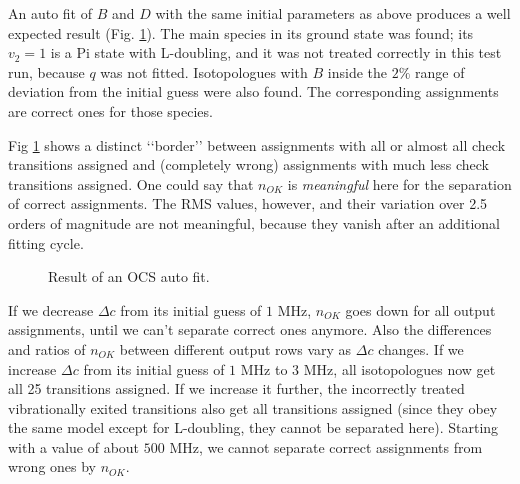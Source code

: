 \documentclass[11pt]{article}
\begin{document}
An auto fit of $B$ and $D$ with the same initial parameters as above produces a well expected result (Fig. \ref{fig:ocs_first_try}). The main species in its ground state was found; its $v_2 = 1$ is a Pi state with L-doubling, and it was not treated correctly in this test run, because $q$ was not fitted. Isotopologues with $B$ inside the $2\%$ range of deviation from the initial guess were also found. The corresponding assignments are correct ones for those species.

Fig \ref{fig:ocs_first_try} shows a distinct \lq\lq{}border\rq\rq{} between assignments with all or almost all check transitions assigned and (completely wrong) assignments with much less check transitions assigned. One could say that $n_{OK}$ is \emph{meaningful} here for the separation of correct assignments. The RMS values, however, and their variation over 2.5 orders of magnitude are not meaningful, because they vanish after an additional fitting cycle. 

\begin{figure}[h]
\caption{\small Result of an OCS auto fit.}
\label{fig:ocs_first_try}
\end{figure}

If we decrease $\Delta c$ from its initial guess of $1$ MHz, $n_{OK}$ goes down for all output assignments, until we can't separate correct ones anymore. Also the differences and ratios of $n_{OK}$ between different output rows vary as $\Delta c$ changes. If we increase $\Delta c$ from  its initial guess of $1$ MHz to $3$ MHz, all isotopologues now get all 25 transitions assigned. If we increase it further, the incorrectly treated vibrationally exited transitions also get all transitions assigned (since they obey the same model except for L-doubling, they cannot be separated here). Starting with a value of about $500$ MHz, we cannot separate correct assignments from wrong ones by $n_{OK}$.
\end{document}
